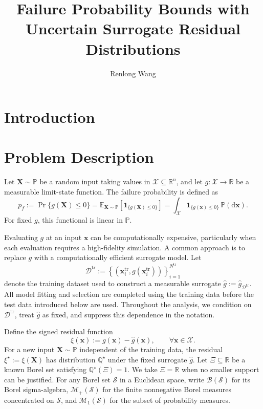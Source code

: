 \documentclass[review,11pt,3p,authoryear,nopreprintline]{elsarticle}
\begin{document}
\begin{frontmatter}
  \title{Failure Probability Bounds with Uncertain Surrogate Residual Distributions}

  \author[inst1]{Renlong Wang}

  \begin{abstract}
  \end{abstract}

  \begin{keyword}
  \end{keyword}
\end{frontmatter}

\section{Introduction}

\section{Problem Description}
\label{sec-problem}

Let $\bm X\sim\mathbb P$ be a random input taking values in $\mathcal X\subseteq\mathbb R^n$, and let $g:\mathcal X\to\mathbb R$ be a measurable limit-state function. The failure probability is defined as
\[
  p_f:=\Pr\{g(\bm X)\le0\}=\mathbb E_{\bm X\sim\mathbb P}\left[\mathbf 1_{\{g(\bm X)\le0\}}\right]=\int_{\mathcal X}\mathbf 1_{\{g(\bm x)\le0\}}\,\mathbb P(\mathrm d\bm x).
\]
For fixed $g$, this functional is linear in $\mathbb P$.

Evaluating $g$ at an input $\bm x$ can be computationally expensive, particularly when each evaluation requires a high-fidelity simulation. A common approach is to replace $g$ with a computationally efficient surrogate model. Let
\[
  \mathcal D^{\mathrm{tr}}:=\left\{\left(\bm x_i^{\mathrm{tr}},g(\bm x_i^{\mathrm{tr}})\right)\right\}_{i=1}^{N^{\mathrm{tr}}}
\]
denote the training dataset used to construct a measurable surrogate $\hat g:=\hat g_{\mathcal D^{\mathrm{tr}}}$. All model fitting and selection are completed using the training data before the test data introduced below are used. Throughout the analysis, we condition on $\mathcal D^{\mathrm{tr}}$, treat $\hat g$ as fixed, and suppress this dependence in the notation.

Define the signed residual function
\[
  \xi(\bm x):=g(\bm x)-\hat g(\bm x),\qquad \forall \bm x\in\mathcal X.
\]
For a new input $\bm X\sim\mathbb P$ independent of the training data, the residual $\xi^\star:=\xi(\bm X)$ has distribution $\mathbb Q^\star$ under the fixed surrogate $\hat g$. Let $\Xi\subseteq\mathbb R$ be a known Borel set satisfying $\mathbb Q^\star(\Xi)=1$. We take $\Xi=\mathbb R$ when no smaller support can be justified. For any Borel set $\mathcal S$ in a Euclidean space, write $\mathcal B(\mathcal S)$ for its Borel sigma-algebra, $\mathcal M_+(\mathcal S)$ for the finite nonnegative Borel measures concentrated on $\mathcal S$, and $\mathcal M_1(\mathcal S)$ for the subset of probability measures.
\end{document}
